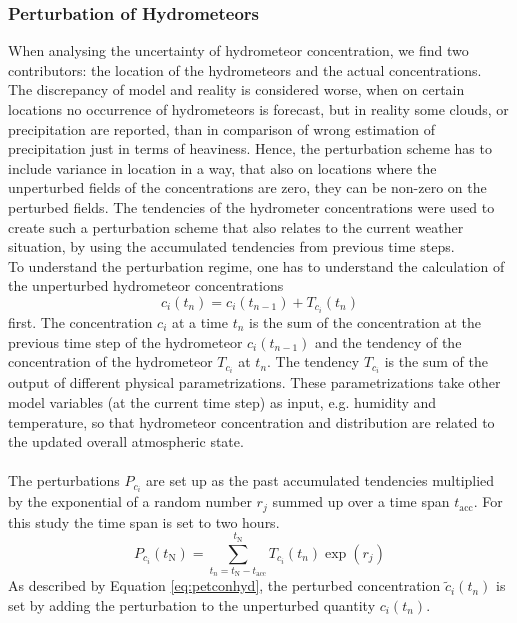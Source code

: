\subsubsection{Perturbation of Hydrometeors}
When analysing the uncertainty of hydrometeor concentration, we find two contributors: the location of the hydrometeors and the actual concentrations.\\
The discrepancy of model and reality is considered worse, when on certain locations no occurrence of hydrometeors is forecast, but in reality some clouds, or precipitation are reported, than in comparison of wrong estimation of precipitation just in terms of heaviness.
Hence, the perturbation scheme has to include variance in location in a way, that also on locations where the unperturbed fields of the concentrations are zero, they can be non-zero on the perturbed fields.
The tendencies of the hydrometer concentrations were used to create such a perturbation scheme that also relates to the current weather situation, by using the accumulated tendencies from previous time steps.\\
To understand the perturbation regime, one has to understand the calculation of the unperturbed hydrometeor concentrations 
\begin{equation}
    c_{i}(t_{n}) = c_{i}(t_{n-1}) + T_{c_{i}}(t_{n})
    \label{eq:hydro}
\end{equation}
first. The concentration $c_{i}$ at a time $t_{n}$ is the sum of the concentration at the previous time step of the hydrometeor $c_{i}(t_{n-1})$ and the tendency of the concentration of the hydrometeor $T_{c_{i}}$ at $t_{n}$. The tendency $T_{c_{i}}$ is the sum of the output of different physical parametrizations. These parametrizations take other model variables (at the current time step) as input, e.g. humidity and temperature, so that hydrometeor concentration and distribution are related to the updated overall atmospheric state.\\ \\
The perturbations $P_{c_{i}}$ are set up as the past accumulated tendencies multiplied by the exponential of a random number $r_{j}$ summed up over a time span $t_{\mathrm{acc}}$. For this study the time span is set to two hours.
\begin{equation}
    P_{c_{i}}(t_{\mathrm{N}}) = \sum\limits_{t_{n}=t_{\mathrm{N}}-t_{\mathrm{acc}}}^{t_{\mathrm{N}}} T_{c_{i}}(t_{n})\exp(r_{j})
    \label{eq:}
\end{equation}
As described by Equation \eqref{eq:petconhyd}, the perturbed concentration $\tilde{c}_{i}(t_{n})$ is set by adding the perturbation to the unperturbed quantity $c_{i}(t_{n})$.
